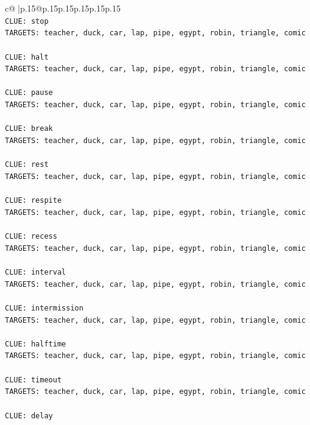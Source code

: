 \documentclass{article}
\begin{document}
{\begin{supertabular}{c@{$\;$}|p{.15\linewidth}@{}p{.15\linewidth}p{.15\linewidth}p{.15\linewidth}p{.15\linewidth}p{.15\linewidth}}
{{{\\ 
\texttt{CLUE: stop} \\
\texttt{TARGETS: teacher, duck, car, lap, pipe, egypt, robin, triangle, comic} \\
\\ 
\texttt{CLUE: halt} \\
\texttt{TARGETS: teacher, duck, car, lap, pipe, egypt, robin, triangle, comic} \\
\\ 
\texttt{CLUE: pause} \\
\texttt{TARGETS: teacher, duck, car, lap, pipe, egypt, robin, triangle, comic} \\
\\ 
\texttt{CLUE: break} \\
\texttt{TARGETS: teacher, duck, car, lap, pipe, egypt, robin, triangle, comic} \\
\\ 
\texttt{CLUE: rest} \\
\texttt{TARGETS: teacher, duck, car, lap, pipe, egypt, robin, triangle, comic} \\
\\ 
\texttt{CLUE: respite} \\
\texttt{TARGETS: teacher, duck, car, lap, pipe, egypt, robin, triangle, comic} \\
\\ 
\texttt{CLUE: recess} \\
\texttt{TARGETS: teacher, duck, car, lap, pipe, egypt, robin, triangle, comic} \\
\\ 
\texttt{CLUE: interval} \\
\texttt{TARGETS: teacher, duck, car, lap, pipe, egypt, robin, triangle, comic} \\
\\ 
\texttt{CLUE: intermission} \\
\texttt{TARGETS: teacher, duck, car, lap, pipe, egypt, robin, triangle, comic} \\
\\ 
\texttt{CLUE: halftime} \\
\texttt{TARGETS: teacher, duck, car, lap, pipe, egypt, robin, triangle, comic} \\
\\ 
\texttt{CLUE: timeout} \\
\texttt{TARGETS: teacher, duck, car, lap, pipe, egypt, robin, triangle, comic} \\
\\ 
\texttt{CLUE: delay} \\
}}}
\end{supertabular}}
\end{document}
